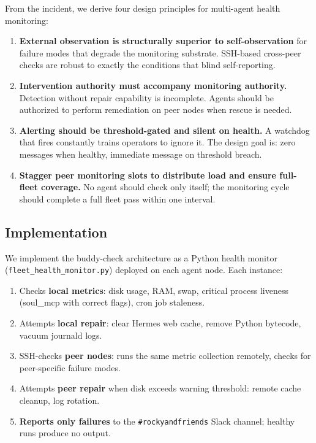 \documentclass[11pt]{article}
\begin{document}
From the incident, we derive four design principles for multi-agent health monitoring:

\begin{enumerate}
  \item \textbf{External observation is structurally superior to self-observation} for failure modes that degrade the monitoring substrate. SSH-based cross-peer checks are robust to exactly the conditions that blind self-reporting.
  \item \textbf{Intervention authority must accompany monitoring authority.} Detection without repair capability is incomplete. Agents should be authorized to perform remediation on peer nodes when rescue is needed.
  \item \textbf{Alerting should be threshold-gated and silent on health.} A watchdog that fires constantly trains operators to ignore it. The design goal is: zero messages when healthy, immediate message on threshold breach.
  \item \textbf{Stagger peer monitoring slots to distribute load and ensure full-fleet coverage.} No agent should check only itself; the monitoring cycle should complete a full fleet pass within one interval.
\end{enumerate}

\subsection{Implementation}

We implement the buddy-check architecture as a Python health monitor (\texttt{fleet\_health\_monitor.py}) deployed on each agent node. Each instance:

\begin{enumerate}
  \item Checks \textbf{local metrics}: disk usage, RAM, swap, critical process liveness (soul\_mcp with correct flags), cron job staleness.
  \item Attempts \textbf{local repair}: clear Hermes web cache, remove Python bytecode, vacuum journald logs.
  \item SSH-checks \textbf{peer nodes}: runs the same metric collection remotely, checks for peer-specific failure modes.
  \item Attempts \textbf{peer repair} when disk exceeds warning threshold: remote cache cleanup, log rotation.
  \item \textbf{Reports only failures} to the \texttt{\#rockyandfriends} Slack channel; healthy runs produce no output.
\end{enumerate}
\end{document}
